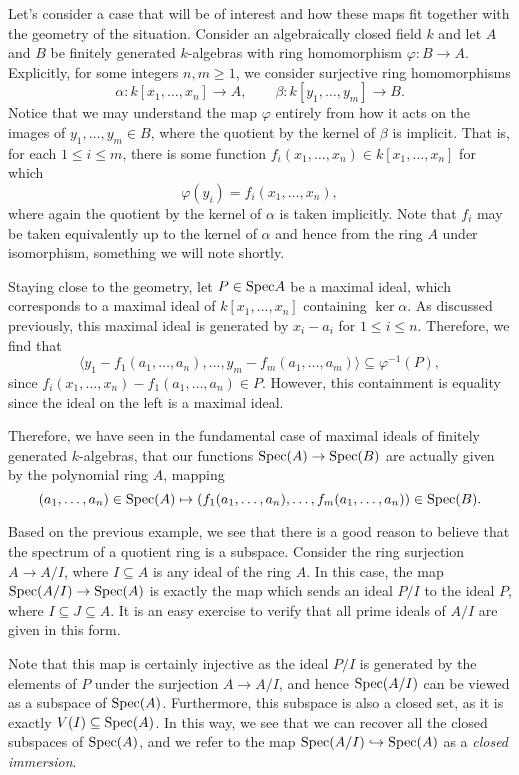 Let's consider a case that will be of interest and how these maps fit together with the geometry of the situation.
Consider an algebraically closed field $k$ and let $A$ and $B$ be finitely generated $k$-algebras with ring homomorphism $\varphi : B \to A$.
Explicitly, for some integers $n, m \geq 1$, we consider surjective ring homomorphisms
\[
    \alpha : k[x_1, \ldots, x_n] \to A, \qquad
    \beta : k[y_1, \ldots, y_m] \to B.
\]
Notice that we may understand the map $\varphi$ entirely from how it acts on the images of $y_1, \ldots, y_m \in B$,
where the quotient by the kernel of $\beta$ is implicit.
That is, for each $1 \leq i \leq m$,
there is some function $f_i(x_1, \ldots, x_n) \in k[x_1, \ldots, x_n]$ for which
\[
    \varphi(y_i) = f_i(x_1, \ldots, x_n),
\]
where again the quotient by the kernel of $\alpha$ is taken implicitly.
Note that $f_i$ may be taken equivalently up to the kernel of $\alpha$ and hence from the ring $A$ under isomorphism,
something we will note shortly.

Staying close to the geometry, let $P \in {\rm Spec} A$ be a maximal ideal,
which corresponds to a maximal ideal of $k[x_1, \ldots, x_n]$ containing $\ker \alpha$.
As discussed previously, this maximal ideal is generated by $x_i - a_i$ for $1 \leq i \leq n$.
Therefore, we find that
\[
    \langle y_1 - f_1(a_1, \ldots, a_n), \ldots, y_m - f_m(a_1, \ldots, a_m) \rangle \subseteq \varphi^{-1}(P),
\]
since $f_i(x_1, \ldots, x_n) - f_1(a_1, \ldots, a_n) \in P$.
However, this containment is equality since the ideal on the left is a maximal ideal.

Therefore, we have seen in the fundamental case of maximal ideals of finitely generated $k$-algebras,
that our functions ${\rm Spec}(A) \to {\rm Spec}(B)$ are actually given by the polynomial ring $A$,
mapping
\[
    (a_1, \ldots, a_n) \in {\rm Spec}(A) 
    \mapsto 
    (f_1(a_1, \ldots, a_n), \ldots, f_m(a_1, \ldots, a_n)) \in {\rm Spec}(B).
\]

Based on the previous example, we see that there is a good reason to believe that the spectrum of a quotient ring is a subspace.
Consider the ring surjection $A \to A/I$, where $I \subseteq A$ is any ideal of the ring $A$.
In this case, the map ${\rm Spec}(A/I) \to {\rm Spec}(A)$ is exactly the map which sends an ideal $P/I$ to the ideal $P$,
where $I \subseteq J \subseteq A$.
It is an easy exercise to verify that all prime ideals of $A/I$ are given in this form.

Note that this map is certainly injective as the ideal $P/I$ is generated by the elements of $P$ under the surjection $A \to A/I$,
and hence ${\rm Spec}(A/I)$ can be viewed as a subspace of ${\rm Spec}(A)$.
Furthermore, this subspace is also a closed set,
as it is exactly $V(I) \subseteq {\rm Spec}(A)$.
In this way, we see that we can recover all the closed subspaces of ${\rm Spec}(A)$,
and we refer to the map ${\rm Spec}(A/I) \hookrightarrow {\rm Spec}(A)$ as a \textit{closed immersion}.

